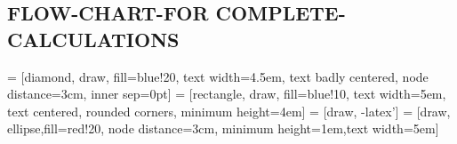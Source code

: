 \documentclass[journal]{IEEEtran}
\begin{document}
\begin{flushleft}
\begin{figure}
{\begin{tabular}{|c|c|c|c|}
	\end{tabular}

}
	
	\end{figure}
\end{flushleft}

\onecolumn
\subsection{FLOW-CHART-FOR COMPLETE-CALCULATIONS}
 = [diamond, draw, fill=blue!20, 
text width=4.5em, text badly centered, node distance=3cm, inner sep=0pt]
 = [rectangle, draw, fill=blue!10, 
text width=5em, text centered, rounded corners, minimum height=4em]
 = [draw, -latex']
 = [draw, ellipse,fill=red!20, node distance=3cm,
minimum height=1em,text width=5em]
\end{document}
